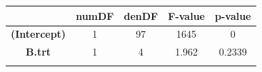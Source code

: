 \documentclass[]{article}
\begin{document}
\begin{longtable}[]{@{}ccccc@{}}
\toprule
\begin{minipage}[b]{0.29\columnwidth}\centering\strut
~
\strut\end{minipage} &
\begin{minipage}[b]{0.10\columnwidth}\centering\strut
numDF
\strut\end{minipage} &
\begin{minipage}[b]{0.10\columnwidth}\centering\strut
denDF
\strut\end{minipage} &
\begin{minipage}[b]{0.12\columnwidth}\centering\strut
F-value
\strut\end{minipage} &
\begin{minipage}[b]{0.12\columnwidth}\centering\strut
p-value
\strut\end{minipage}\tabularnewline
\midrule
\endhead
\begin{minipage}[t]{0.29\columnwidth}\centering\strut
\textbf{(Intercept)}
\strut\end{minipage} &
\begin{minipage}[t]{0.10\columnwidth}\centering\strut
1
\strut\end{minipage} &
\begin{minipage}[t]{0.10\columnwidth}\centering\strut
97
\strut\end{minipage} &
\begin{minipage}[t]{0.12\columnwidth}\centering\strut
1645
\strut\end{minipage} &
\begin{minipage}[t]{0.12\columnwidth}\centering\strut
0
\strut\end{minipage}\tabularnewline
\begin{minipage}[t]{0.29\columnwidth}\centering\strut
\textbf{B.trt}
\strut\end{minipage} &
\begin{minipage}[t]{0.10\columnwidth}\centering\strut
1
\strut\end{minipage} &
\begin{minipage}[t]{0.10\columnwidth}\centering\strut
4
\strut\end{minipage} &
\begin{minipage}[t]{0.12\columnwidth}\centering\strut
1.962
\strut\end{minipage} &
\begin{minipage}[t]{0.12\columnwidth}\centering\strut
0.2339
\strut\end{minipage}\tabularnewline
\begin{minipage}[t]{0.29\columnwidth}\centering\strut

\end{minipage}
\end{longtable}
\end{document}
